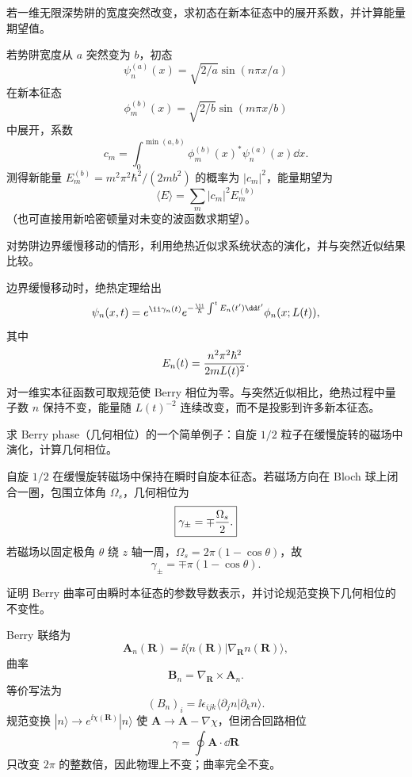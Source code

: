 \begin{question}
若一维无限深势阱的宽度突然改变，求初态在新本征态中的展开系数，并计算能量期望值。
\end{question}
\begin{solution}
若势阱宽度从 $a$ 突然变为 $b$，初态
\[
\psi_n^{(a)}(x)=\sqrt{2/a}\sin(n\pi x/a)
\]
在新本征态
\[
\phi_m^{(b)}(x)=\sqrt{2/b}\sin(m\pi x/b)
\]
中展开，系数
\[
c_m=\int_0^{\min(a,b)}\phi_m^{(b)}(x)^*\psi_n^{(a)}(x)\dd x.
\]
测得新能量 $E_m^{(b)}=m^2\pi^2\hbar^2/(2mb^2)$ 的概率为 $|c_m|^2$，能量期望为
\[
\langle E\rangle=\sum_m |c_m|^2E_m^{(b)}
\]
（也可直接用新哈密顿量对未变的波函数求期望）。
\end{solution}

\begin{question}
对势阱边界缓慢移动的情形，利用绝热近似求系统状态的演化，并与突然近似结果比较。
\end{question}
\begin{solution}
边界缓慢移动时，绝热定理给出
\[
\psi_n(x,t)=e^{\ii\gamma_n(t)}e^{-{\ii\over\hbar}\int^t E_n(t')\dd t'}\phi_n(x;L(t)),
\]
其中
\[
E_n(t)={n^2\pi^2\hbar^2\over2mL(t)^2}.
\]
对一维实本征函数可取规范使 Berry 相位为零。与突然近似相比，绝热过程中量子数 $n$ 保持不变，能量随 $L(t)^{-2}$ 连续改变，而不是投影到许多新本征态。
\end{solution}

\begin{question}
求 Berry phase（几何相位）的一个简单例子：自旋 $1/2$ 粒子在缓慢旋转的磁场中演化，计算几何相位。
\end{question}
\begin{solution}
自旋 $1/2$ 在缓慢旋转磁场中保持在瞬时自旋本征态。若磁场方向在 Bloch 球上闭合一圈，包围立体角 $\Omega_s$，几何相位为
\[
\boxed{\gamma_\pm=\mp{\Omega_s\over2}.}
\]
若磁场以固定极角 $\theta$ 绕 $z$ 轴一周，$\Omega_s=2\pi(1-
\cos\theta)$，故
\[
\gamma_\pm=\mp\pi(1-
\cos\theta).
\]
\end{solution}

\begin{question}
证明 Berry 曲率可由瞬时本征态的参数导数表示，并讨论规范变换下几何相位的不变性。
\end{question}
\begin{solution}
Berry 联络为
\[
\mathbf A_n(\mathbf R)=\ii\langle n(\mathbf R)|\nabla_\mathbf R n(\mathbf R)\rangle,
\]
曲率
\[
\mathbf B_n=\nabla_\mathbf R\times\mathbf A_n.
\]
等价写法为
\[
(B_n)_i=\ii\epsilon_{ijk}\langle\partial_j n|\partial_k n\rangle.
\]
规范变换 $|n\rangle\to e^{\ii\chi(\mathbf R)}|n\rangle$ 使 $\mathbf A\to\mathbf A-\nabla\chi$，但闭合回路相位
\[
\gamma=\oint\mathbf A\cdot\dd\mathbf R
\]
只改变 $2\pi$ 的整数倍，因此物理上不变；曲率完全不变。
\end{solution}

